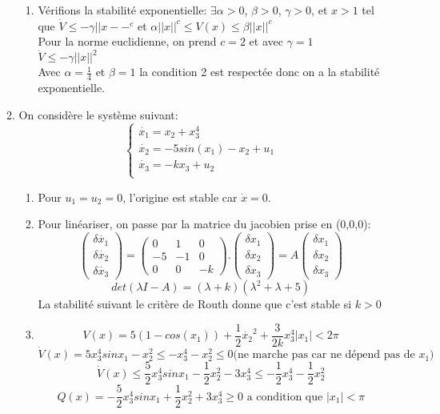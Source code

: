 \documentclass{../../td}
\begin{document}
\begin{enumerate}
\begin{enumerate}
\begin{enumerate}
\item Vérifions la stabilité exponentielle: 
$\exists \alpha>0$, $\beta>0$, $\gamma>0$, et $x>1$ tel que $\dot{V} \leq - \gamma||x--^c$ et $\alpha||x||^c \leq V(x) \leq \beta ||x||^c$\\
Pour la norme euclidienne, on prend $c=2$ et avec $\gamma = 1$\\
$\dot{V} \leq -\gamma||x||^2$\\
Avec $\alpha = \frac{1}{4}$ et $\beta = 1$ la condition 2 est respectée donc on a la stabilité exponentielle.
\end{enumerate}

\item On considère le système suivant:
  \[       \begin{cases}
      \dot{x_1} = x_2 + x_3^4 \\
      \dot{x_2} = -5sin(x_1) - x_2 + u_1 \\
      \dot{x_3} = -kx_3 + u_2 \\
    \end{cases}
\]
\begin{enumerate}
\item Pour $u_1 = u_2 = 0$, l'origine est stable car $\dot{x} = 0 $.\\

\item Pour linéariser, on passe par la matrice du jacobien prise en (0,0,0):
\[
\begin{pmatrix}
\delta \dot{x_1} \\\delta \dot{x_2} \\\delta \dot{x_3}
\end{pmatrix} = \begin{pmatrix}
0 & 1& 0\\-5 & -1 & 0\\0 & 0& -k
\end{pmatrix}.\begin{pmatrix}
\delta x_1 \\ \delta x_2 \\ \delta x_3
\end{pmatrix} = A \begin{pmatrix}
\delta x_1 \\ \delta x_2 \\ \delta x_3
\end{pmatrix}\]
\[
det(\lambda I - A) = (\lambda  + k)(\lambda^2 + \lambda + 5)
\]
La stabilité suivant le critère de Routh donne que c'est stable si $k>0$

\item \[V(x) = 5(1-cos(x_1)) + \frac{1}{2} \dot{x_2}^2 + \frac{3}{2k}x_3^4
|x_1| < 2\pi\]
\[\dot{V}(x) = 5x_3^4sinx_1 - x_2^2 \leq -x_3^4 - x_2^2 \leq 0 \text{(ne marche pas car ne dépend pas de $x_1$)}\]
\[\dot{V}(x) \leq \frac{5}{2} x_3^4 sin x_1 -\frac{1}{2}x_2^2 - 3 x_3^4 \leq -\frac{1}{2}x_3^4 - \frac{1}{2}x_2^2\]
\[Q(x) = -\frac{5}{2}x_3^4sinx_1 + \frac{1}{2}x_2^2 + 3x_3^4 \geq 0 \text{ a condition que } |x_1| < \pi
\]
\end{enumerate}

\end{enumerate}
\end{enumerate}
\end{document}
